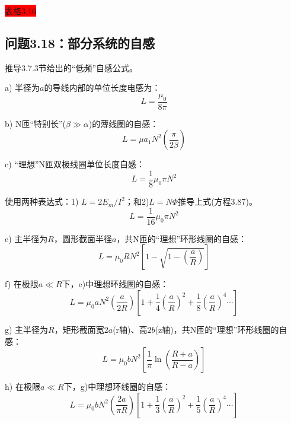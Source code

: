 \colorbox{red}{表格3.16}




\subsection{问题3.18：部分系统的自感}
推导3.7.3节给出的“低频”自感公式。

a) 半径为$a$的导线内部的单位长度电感为：
 \begin{equation*}%
L=\frac{\mu_0}{8\pi} \tag{3.83}
\end{equation*}

b) N匝“特别长”($\beta\gg \alpha$)的薄线圈的自感：
 \begin{equation*}%
L=\mu a_1N^2\left(\frac{\pi}{2\beta}\right) \tag{3.84c}
\end{equation*}

c) “理想”N匝双极线圈单位长度自感：
 \begin{equation*}%
L=\frac{1}{8}\mu_0\pi N^2 \tag{3.87}
\end{equation*}

使用两种表达式：1) $L= 2E_m/I^2$；和2)$ L=N\Phi$推导上式(方程3.87)。
\begin{equation*}%
L=\frac{1}{16}\mu_0\pi N^2 \tag{3.88}
\end{equation*}

e) 主半径为$R$，圆形截面半径$a$，共N匝的“理想”环形线圈的自感：
 \begin{equation*}%
L=\mu_0 R N^2\left[1-\sqrt{1-\left(\frac{a}{R}\right)}\right] \tag{3.89a}
\end{equation*}

f) 在极限$a\ll R$下，e)中理想环线圈的自感：
 \begin{equation*}%
L=\mu_0aN^2(\frac{a}{2R})[1+\frac{1}{4}(\frac{a}{R})^2+\frac{1}{8}(\frac{a}{R})^4\cdots] \tag{3.89b}
\end{equation*}

g) 主半径为$R$，矩形截面宽$2a$(r轴)、高$2b$(z轴)，共N匝的“理想”环形线圈的自感：
 \begin{equation*}%
L=\mu_0 b N^2\left[\frac{1}{\pi}\ln\left(\frac{R+a}{R-a}\right)\right] \tag{3.90a}
\end{equation*}

h) 在极限$a\ll R$下，g)中理想环线圈的自感：
 \begin{equation*}%
L=\mu_0bN^2(\frac{2a}{\pi R})[1+\frac{1}{3}(\frac{a}{R})^2+\frac{1}{5}(\frac{a}{R})^4\cdots] \tag{3.90b}
\end{equation*}


